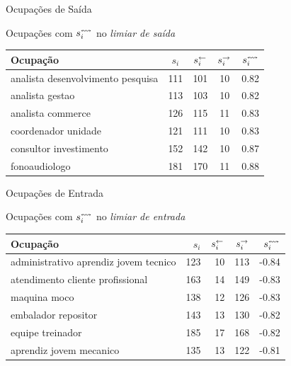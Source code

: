 \documentclass[10pt, hyperref={pdfpagelabels=false}]{beamer}
\begin{document}
\begin{frame}[label=hipotese-ponto-de-saida-tabela]{Ocupações de Saída}
  \begin{center}
    \large
    Ocupações com $s_i^\leftrightsquigarrow$ no \textit{limiar de saída}
    
    \normalsize
    \vspace{\baselineskip}
    
    \begin{tabular}{l|c|c|c|c}
      \hline
      Ocupação & $s_i$ & $s_i^\leftarrow$ & $s_i^\rightarrow$ & $s_i^\leftrightsquigarrow$\\
      \hline
      analista desenvolvimento pesquisa & 111 & 101 & 10 & 0.82\\
      \hline
      analista gestao & 113 & 103 & 10 & 0.82\\
      \hline
      analista commerce & 126 & 115 & 11 & 0.83\\
      \hline
      coordenador unidade & 121 & 111 & 10 & 0.83\\
      \hline
      consultor investimento & 152 & 142 & 10 & 0.87\\
      \hline
      fonoaudiologo & 181 & 170 & 11 & 0.88\\
      \hline
    \end{tabular}
  \end{center}
\end{frame}


\begin{frame}[label=hipotese-ponto-de-entrada-tabela]{Ocupações de Entrada}
  \begin{center}
    \large
    Ocupações com $s_i^\leftrightsquigarrow$ no \textit{limiar de entrada}
    
    \normalsize
    \vspace{\baselineskip}
    
    \begin{tabular}{l|r|r|r|r}
      \hline
      Ocupação & $s_i$ & $s_i^\leftarrow$ & $s_i^\rightarrow$ & $s_i^\leftrightsquigarrow$\\
      \hline
      administrativo aprendiz jovem tecnico & 123 & 10 & 113 & -0.84\\
      \hline
      atendimento cliente profissional & 163 & 14 & 149 & -0.83\\
      \hline
      maquina moco & 138 & 12 & 126 & -0.83\\
      \hline
      embalador repositor & 143 & 13 & 130 & -0.82\\
      \hline
      equipe treinador & 185 & 17 & 168 & -0.82\\
      \hline
      aprendiz jovem mecanico & 135 & 13 & 122 & -0.81\\
      \hline
    \end{tabular}
  \end{center}
\end{frame}
\end{document}
